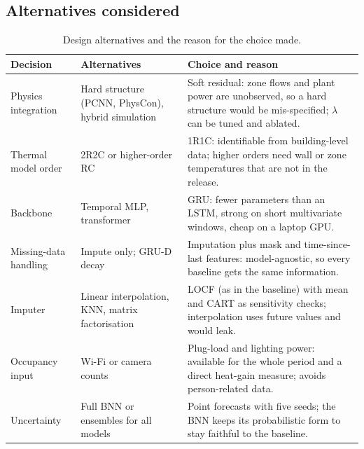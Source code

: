 \subsection{Alternatives considered}
\begin{table}[H]
\centering\small
\caption{Design alternatives and the reason for the choice made.}\label{tab:alternatives}
\begin{tabular}{p{3.6cm}p{4.3cm}p{6.6cm}}
\toprule
Decision & Alternatives & Choice and reason \\
\midrule
Physics integration & Hard structure (PCNN, PhysCon), hybrid simulation & Soft residual: zone flows and plant power are unobserved, so a hard structure would be mis-specified; $\lambda$ can be tuned and ablated. \\
Thermal model order & 2R2C or higher-order RC & 1R1C: identifiable from building-level data; higher orders need wall or zone temperatures that are not in the release. \\
Backbone & Temporal MLP, transformer & GRU: fewer parameters than an LSTM, strong on short multivariate windows, cheap on a laptop GPU. \\
Missing-data handling & Impute only; GRU-D decay & Imputation plus mask and time-since-last features: model-agnostic, so every baseline gets the same information. \\
Imputer & Linear interpolation, KNN, matrix factorisation & LOCF (as in the baseline) with mean and CART as sensitivity checks; interpolation uses future values and would leak. \\
Occupancy input & Wi-Fi or camera counts & Plug-load and lighting power: available for the whole period and a direct heat-gain measure; avoids person-related data. \\
Uncertainty & Full BNN or ensembles for all models & Point forecasts with five seeds; the BNN keeps its probabilistic form to stay faithful to the baseline. \\
\bottomrule
\end{tabular}
\end{table}
